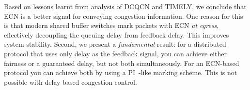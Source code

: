  Based on lessons learnt from analysis of DCQCN and TIMELY,
we conclude that ECN is a better signal for conveying congestion information.
One reason for this is that modern shared buffer switches mark packets with ECN
{\em at egress}, effectively decoupling the queuing delay from feedback delay.
This improves system stability. Second, we present a \emph{fundamental} result:
for a distributed protocol that uses only delay as the feedback signal, you can
achieve either fairness or a guaranteed delay, but not both simultaneously. For
an ECN-based protocol you can achieve both by using a
PI~\cite{hollot2001designing}-like marking scheme. This is not possible with
delay-based congestion control.




